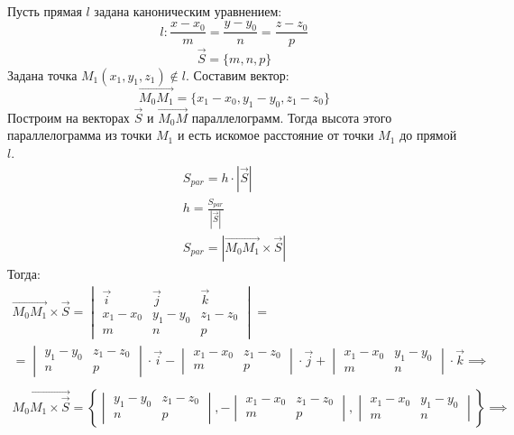 Пусть прямая $l$ задана каноническим уравнением:  \[
l: \frac{x - x_0}{m} = \frac{y - y_0}{n} = \frac{z - z_0}{p}
\] \[
\vec{S} = \{m, n, p\} 
\] 
Задана точка $M_1(x_1, y_1, z_1) \not \in l$.
Составим вектор:  \[
\overrightarrow{M_0M_1} = \{x_1 - x_0, y_1 - y_0, z_1 - z_0\} 
\] 
Построим на векторах $\vec{S}$ и $\overrightarrow{M_0M}$ параллелограмм.
Тогда высота этого параллелограмма из точки $M_1$ и есть искомое расстояние от точки $M_1$ до прямой $l$.
\begin{gather*}
  S_{par} = h \cdot |\vec{S}| \\
  h = \frac{S_{par}}{|\vec{S}|} \\
  S_{par} = |\overrightarrow{M_0M_1} \times \vec{S}| 
\end{gather*}
Тогда:
\begin{gather*}
  \overrightarrow{M_0M_1} \times \vec{S} = 
  \begin{vmatrix}
    \vec{i} & \vec{j} & \vec{k} \\
    x_1 - x_0 & y_1 - y_0 & z_1 - z_0 \\
    m & n & p
  \end{vmatrix} = \\
  = \begin{vmatrix}
    y_1 - y_0 & z_1 - z_0 \\
    n & p
  \end{vmatrix} \cdot \vec{i} -
  \begin{vmatrix}
    x_1 - x_0 & z_1 - z_0 \\
    m & p
  \end{vmatrix} \cdot \vec{j} + 
  \begin{vmatrix}
    x_1 - x_0 & y_1 - y_0 \\
    m & n
  \end{vmatrix} \cdot \vec{k} \implies \\
  \\
  \overrightarrow{M_0M_1 \times \vec{S}} = 
  \left\{
  \begin{vmatrix}
    y_1 - y_0 & z_1 - z_0 \\
    n & p
  \end{vmatrix},
   - \begin{vmatrix}
    x_1 - x_0 & z_1 - z_0 \\
    m & p
  \end{vmatrix}, 
  \begin{vmatrix}
    x_1 - x_0 & y_1 - y_0 \\
    m & n
  \end{vmatrix}
  \right\} \implies \\

\end{gather*}
